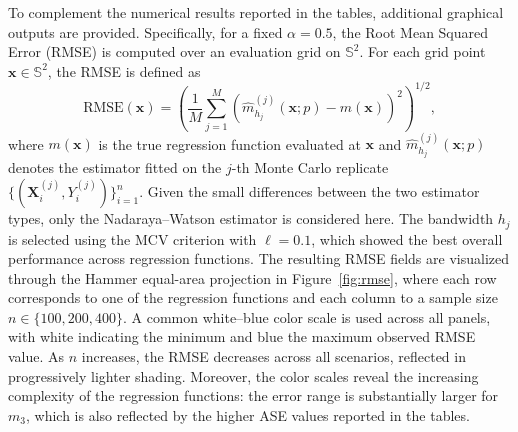 \documentclass[12pt]{report} %
\newcommand{\bX}{\mathbf{X}}
\newcommand{\bx}{\mathbf{x}}
\begin{document}
To complement the numerical results reported in the tables, additional graphical outputs are provided. Specifically, for a fixed  $\alpha = 0.5$, the Root Mean Squared Error (RMSE) is computed over an evaluation grid on $\mathbb{S}^2$. For each grid point $\bx \in \mathbb{S}^2$, the RMSE is defined as 
\begin{equation}
\label{eq:rmse}
\mathrm{RMSE}(\bx) = \left( \frac{1}{M} \sum_{j=1}^{M} \left( \hat{m}_{h_j}^{(j)}(\bx; p) - m(\bx) \right)^2 \right)^{1/2},
\end{equation}
where $m(\bx)$ is the true regression function evaluated at $\bx$ and $\hat{m}_{h_j}^{(j)}(\bx; p)$ denotes the estimator fitted on the $j$-th Monte Carlo replicate $\{(\bX_i^{(j)}, Y_i^{(j)})\}_{i=1}^{n}$. Given the small differences between the two estimator types, only the Nadaraya--Watson estimator is considered here. The bandwidth $h_j$ is selected using the MCV criterion with $\ell = 0.1$, which showed the 
best overall performance across regression functions. The resulting RMSE fields are visualized through the Hammer equal-area projection in Figure~\ref{fig:rmse}, where each row corresponds to one of the regression functions and each column to a sample size $n\in\{100, 200, 400\}$. A common white--blue color scale is used across all panels, with white indicating the minimum and blue the maximum observed RMSE value. As $n$ increases, the RMSE decreases across all scenarios, reflected in progressively lighter shading. Moreover, the color scales reveal the increasing complexity 
of the regression functions: the error range is 
substantially larger for $m_3$, which is also reflected by the higher ASE values reported in the tables.
\end{document}
